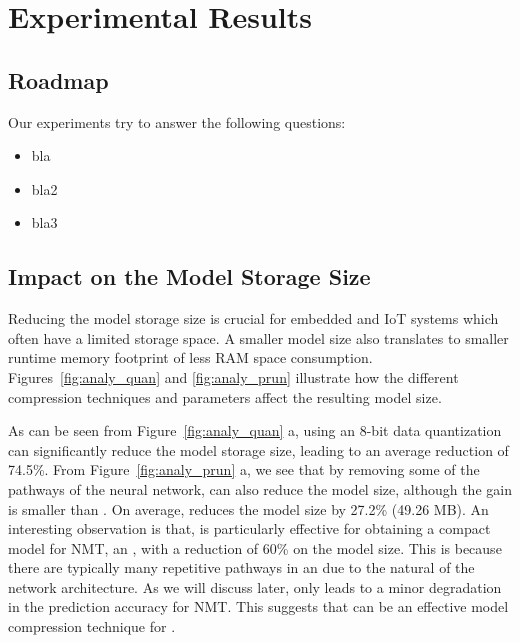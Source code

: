 \section{Experimental Results}


\subsection{Roadmap}
Our experiments try to answer the following questions:

\begin{itemize}
\item bla
\item bla2
\item bla3
\end{itemize}

\subsection{Impact on the Model Storage Size}
Reducing the model storage size is crucial for embedded and IoT systems which often have a limited storage space. A smaller model size also
translates to smaller runtime memory footprint of less RAM space consumption. Figures~\ref{fig:analy_quan} and  \ref{fig:analy_prun}
illustrate how the different compression techniques and parameters affect the resulting model size.

As can be seen from Figure~\ref{fig:analy_quan} a, using an 8-bit data quantization can significantly reduce the model storage size,
leading to an average reduction of 74.5\%. From Figure~\ref{fig:analy_prun} a, we see that by removing some of the pathways of the neural
network, \pruning can also reduce the model size, although the gain is smaller than \quantization. On average, \pruning reduces the model
size by 27.2\% (49.26 MB). An interesting observation is that, \pruning is particularly effective for obtaining a compact model for
NMT, an \RNN, with a reduction of 60\% on the model size. This is because there are typically many repetitive pathways in an \RNN due to
the natural of the network architecture. As we will discuss later, \pruning only leads to a minor degradation in the prediction accuracy
for NMT. This suggests that \pruning can be an effective model compression technique for \RNNs.



